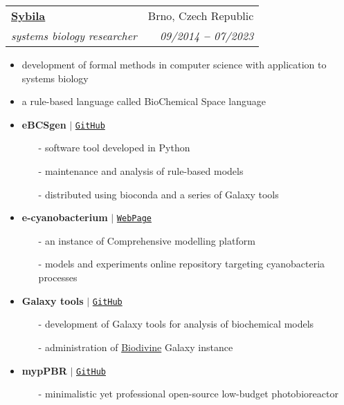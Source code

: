 \documentclass[letterpaper,11pt]{article}
\makeatletter
\newcommand{\resumeSubheading}[4]{
  \vspace{-2pt}\item
    \begin{tabular*}{0.97\textwidth}[t]{l@{\extracolsep{\fill}}r}
      \textbf{#1} & #2 \\
      \textit{\small#3} & \textit{\small #4} \\
    \end{tabular*}\vspace{-7pt}
}
\makeatother
\begin{document}
  \vspace{10pt}
    
  \resumeSubheading
  {\href{https://sybila.fi.muni.cz/}{Sybila}}{Brno, Czech Republic}
  {systems biology researcher}{09/2014 \textbf{--} 07/2023}
  \small{
    \begin{itemize}
      \item development of formal methods in computer science with application to systems biology \vspace{-2pt}
      \item a rule-based language called BioChemical Space language \vspace{2pt}
      \item \textbf{eBCSgen} $|$ \href{https://github.com/sybila/eBCSgen}{\color{blue}\texttt{GitHub}} \vspace{-2pt}
      \begin{itemize}
        \item[-] software tool developed in Python \vspace{-2pt}
        \item[-] maintenance and analysis of rule-based models \vspace{-2pt}
        \item[-] distributed using bioconda and a series of Galaxy tools
      \end{itemize}
      \item \textbf{e-cyanobacterium} $|$ \href{https://www.e-cyanobacterium.org/}{\color{blue}\texttt{WebPage}} \vspace{-2pt}
      \begin{itemize}
        \item[-] an instance of Comprehensive modelling platform \vspace{-2pt}
        \item[-] models and experiments online repository targeting cyanobacteria processes \vspace{-2pt}
      \end{itemize}
      \item \textbf{Galaxy tools} $|$ \href{https://github.com/sybila/galaxytools}{\color{blue}\texttt{GitHub}} \vspace{-2pt}
      \begin{itemize}
        \item[-] development of Galaxy tools for analysis of biochemical models \vspace{-2pt}
        \item[-] administration of \href{https://biodivine-vm.fi.muni.cz/galaxy}{Biodivine} Galaxy instance \vspace{-2pt}
      \end{itemize}
      \item \textbf{mypPBR} $|$ \href{https://github.com/xtrojak/bioreactor}{\color{blue}\texttt{GitHub}} \vspace{-2pt}
      \begin{itemize}
        \item[-] minimalistic yet professional open-source low-budget photobioreactor \vspace{-2pt}
      \end{itemize}
    \end{itemize}
  }
\end{document}
